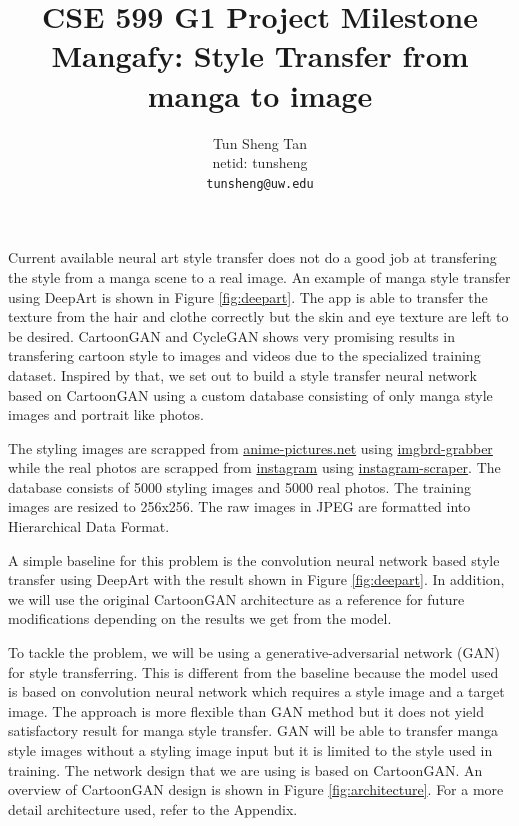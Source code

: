 \documentclass{article}
\title{CSE 599 G1 Project Milestone\\Mangafy: Style Transfer from manga to image}
\author{%
Tun Sheng Tan\\
netid: tunsheng\\
\texttt{tunsheng@uw.edu}
}
\begin{document}
\maketitle

Current available neural art style transfer does not do a good job at transfering the style from a manga scene to a real image. An example of manga style transfer using DeepArt \cite{deepart} is shown in Figure \ref{fig:deepart}. The app is able to transfer the texture from the hair and clothe correctly but the skin and eye texture are left to be desired. CartoonGAN \cite{CartoonGAN} and CycleGAN \cite{CycleGAN} shows very promising results in transfering cartoon style to images and videos due to the specialized training dataset. Inspired by that, we set out to build a style transfer neural network based on CartoonGAN using a custom database consisting of only manga style images and portrait like photos.

The styling images are scrapped from \href{https:\\anime-pictures.net}{anime-pictures.net} using \href{https://bionus.github.io/imgbrd-grabber/}{imgbrd-grabber} while the real photos are scrapped from \href{https://instagram.com}{instagram} using \href{https://bionus.github.io/imgbrd-grabber/}{instagram-scraper}. The database consists of 5000 styling images and 5000 real photos. The training images are resized to 256x256. The raw images in JPEG are formatted into Hierarchical Data Format.

A simple baseline for this problem is the convolution neural network based style transfer using DeepArt \cite{deepart} with the result shown in Figure \ref{fig:deepart}. In addition, we will use the original CartoonGAN architecture as a reference for future modifications depending on the results we get from the model.

To tackle the problem, we will be using a generative-adversarial network (GAN) for style transferring. This is different from the baseline because the model used is based on convolution neural network which requires a style image and a target image. The approach is more flexible than GAN method but it does not yield satisfactory result for manga style transfer. GAN will be able to transfer manga style images without a styling image input but it is limited to the style used in training. The network design that we are using is based on CartoonGAN. An overview of CartoonGAN design is shown in Figure \ref{fig:architecture}. For a more detail architecture used, refer to the Appendix.
\end{document}
